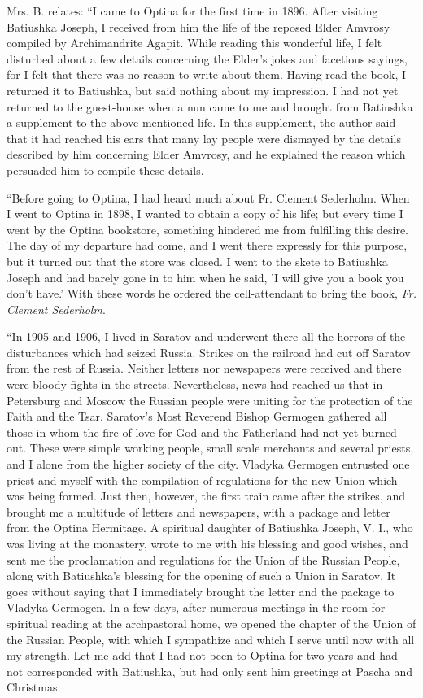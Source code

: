 Mrs. B. relates: “I came to Optina for the first time in 1896. After visiting Batiushka Joseph, I received from him the life of the reposed Elder Amvrosy compiled by Archimandrite Agapit. While reading this wonderful life, I felt disturbed about a few details concerning the Elder's jokes and facetious sayings, for I felt that there was no reason to write about them. Having read the book, I returned it to Batiushka, but said nothing about my impression. I had not yet returned to the guest-house when a nun came to me and brought from Batiushka a supplement to the above-mentioned life. In this supplement, the author said that it had reached his ears that many lay people were dismayed by the details described by him concerning Elder Amvrosy, and he explained the reason which persuaded him to compile these details.

“Before going to Optina, I had heard much about Fr. Clement Sederholm. When I went to Optina in 1898, I wanted to obtain a copy of his life; but every time I went by the Optina bookstore, something hindered me from fulfilling this desire. The day of my departure had come, and I went there expressly for this purpose, but it turned out that the store was closed. I went to the skete to Batiushka Joseph and had barely gone in to him when he said, 'I will give you a book you don't have.' With these words he ordered the cell-attendant to bring the book, \textit{Fr. Clement Sederholm}.

“In 1905 and 1906, I lived in Saratov and underwent there all the horrors of the disturbances which had seized Russia. Strikes on the railroad had cut off Saratov from the rest of Russia. Neither letters nor newspapers were received and there were bloody fights in the streets. Nevertheless, news had reached us that in Petersburg and Moscow the Russian people were uniting for the protection of the Faith and the Tsar. Saratov's Most Reverend Bishop Germogen gathered all those in whom the fire of love for God and the Fatherland had not yet burned out. These were simple working people, small scale merchants and several priests, and I alone from the higher society of the city. Vladyka Germogen entrusted one priest and myself with the compilation of regulations for the new Union which was being formed. Just then, however, the first train came after the strikes, and brought me a multitude of letters and newspapers, with a package and letter from the Optina Hermitage. A spiritual daughter of Batiushka Joseph, V. I., who was living at the monastery, wrote to me with his blessing and good wishes, and sent me the proclamation and regulations for the Union of the Russian People, along with Batiushka's blessing for the opening of such a Union in Saratov. It goes without saying that I immediately brought the letter and the package to Vladyka Germogen. In a few days, after numerous meetings in the room for spiritual reading at the archpastoral home, we opened the chapter of the Union of the Russian People, with which I sympathize and which I serve until now with all my strength. Let me add that I had not been to Optina for two years and had not corresponded with Batiushka, but had only sent him greetings at Pascha and Christmas.


